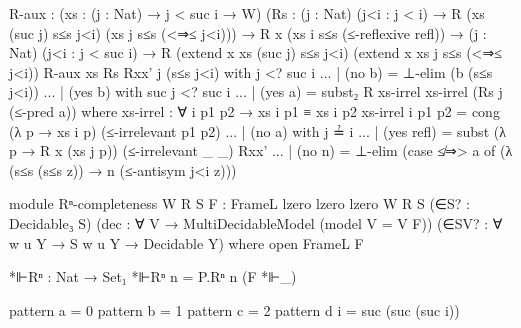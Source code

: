 \begin{spverbatim}
        R-aux : (xs : (j : Nat) → {j < suc i} → W) (Rs : (j : Nat) (j<i : j < i)
          → R (xs (suc j) {s≤s j<i}) (xs j {s≤s (<⇒≤ j<i)}))
          → R x (xs i {s≤s (≤-reflexive refl)})
          → (j : Nat) (j<i : j < suc i)
          → R (extend x xs (suc j) {s≤s j<i}) (extend x xs j {s≤s (<⇒≤ j<i)})
        R-aux xs Rs Rxx' j (s≤s j<i) with j <? suc i
        ... | (no b) = ⊥-elim (b (s≤s j<i))
        ... | (yes b) with suc j <? suc i
        ... | (yes a) = subst₂ R xs-irrel xs-irrel (Rs j (≤-pred a))
          where
          xs-irrel : ∀ {i p1 p2} → xs i {p1} ≡ xs i {p2}
          xs-irrel {i} {p1} {p2} = cong (λ p → xs i {p}) (≤-irrelevant p1 p2)
        ... | (no a) with j ≟ i
        ... | (yes refl) = subst (λ p → R x (xs j {p})) (≤-irrelevant _ _) Rxx'
        ... | (no n) = ⊥-elim (case ≰⇒> a of (λ { (s≤s (s≤s z)) → n (≤-antisym j<i z)}))

module Rⁿ-completeness
  {W R S}
  {F : FrameL {lzero} {lzero} {lzero} W R S}
  (∈S? : Decidable₃ S)
  (dec : ∀ V → MultiDecidableModel (model {V = V} F))
  (∈SV? : ∀ {w u Y} → S w u Y → Decidable Y)
  where
  open FrameL F

  *⊩Rⁿ : Nat → Set₁
  *⊩Rⁿ n = P.Rⁿ n (F *⊩_)

  pattern a = 0
  pattern b = 1
  pattern c = 2
  pattern d i = suc (suc (suc i))



\end{spverbatim}
